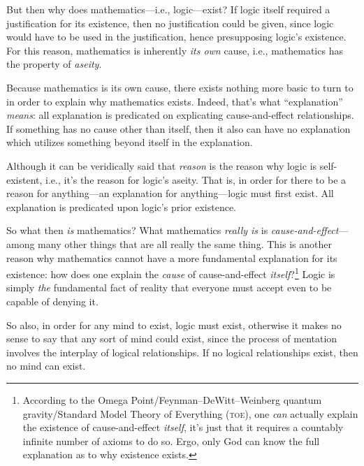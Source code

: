 \documentclass[letterpaper,12pt]{article}
\begin{document}
But then why does mathematics---i.e., logic---exist? If logic itself required a justification for its existence, then no justification could be given, since logic would have to be used in the justification, hence presupposing logic's existence. For this reason, mathematics is inherently \emph{its own} cause, i.e., mathematics has the property of \emph{aseity}.

Because mathematics is its own cause, there exists nothing more basic to turn to in order to explain why mathematics exists. Indeed, that's what ``explanation'' \emph{means}: all explanation is predicated on explicating cause-and-effect relationships. If something has no cause other than itself, then it also can have no explanation which utilizes something beyond itself in the explanation.

Although it can be veridically said that \emph{reason} is the reason why logic is self-existent, i.e., it's the reason for logic's aseity. That is, in order for there to be a reason for anything---an explanation for anything---logic must first exist. All explanation is predicated upon logic's prior existence.

So what then \emph{is} mathematics? What mathematics \emph{really is} is \emph{cause-and-effect}---among many other things that are all really the same thing. This is another reason why mathematics cannot have a more fundamental explanation for its existence: how does one explain the \emph{cause} of cause-and-effect \emph{itself}?\footnote{According to the Omega Point\slash Feynman--DeWitt--Weinberg quantum gravity\slash Standard Model Theory of Everything (\textsc{toe}), one \emph{can} actually explain the existence of cause-and-effect \emph{itself}, it's just that it requires a countably infinite number of axioms to do so. Ergo, only God can know the full explanation as to why existence exists.} Logic is simply \emph{the} fundamental fact of reality that everyone must accept even to be capable of denying it.

So also, in order for any mind to exist, logic must exist, otherwise it makes no sense to say that any sort of mind could exist, since the process of mentation involves the interplay of logical relationships. If no logical relationships exist, then no mind can exist.
\end{document}
